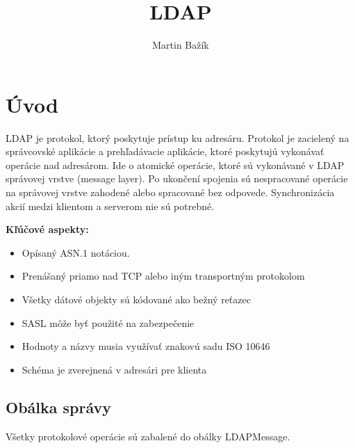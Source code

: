 \documentclass[11pt,a4paper]{article}
\title{LDAP}
\author{Martin Bažík}
\begin{document}
\begin{titlepage}
\maketitle
\end{titlepage}
\tableofcontents
\newpage
\section{Úvod}
LDAP je protokol, ktorý poskytuje prístup ku adresáru. Protokol je zacielený na správcovské aplikácie a prehľadávacie aplikácie, ktoré poskytujú vykonávať operácie nad adresárom. Ide o atomické operácie, ktoré sú vykonávané v LDAP správovej vrstve (message layer). Po ukončení spojenia sú nespracované operácie na správovej vrstve zahodené alebo spracované bez odpovede. Synchronizácia akcií medzi klientom a serverom nie sú potrebné.

\textbf{Kľúčové aspekty:}
\begin{itemize}
	\item Opísaný ASN.1 notáciou.
	\item Prenášaný priamo nad TCP alebo iným transportným protokolom
	\item Všetky dátové objekty sú kódované ako bežný reťazec
	\item SASL môže byť použité na zabezpečenie
	\item Hodnoty a názvy musia využívať znakovú sadu ISO 10646
	\item Schéma je zverejnená v adresári pre klienta
\end{itemize}

\subsection{Obálka správy}
Všetky protokolové operácie sú zabalené do obálky LDAPMessage.
\end{document}
